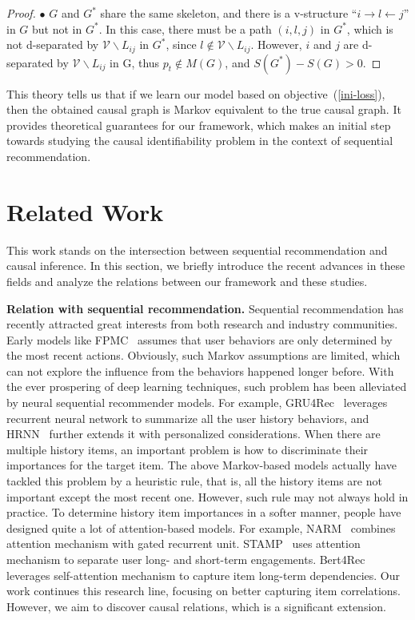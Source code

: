 \documentclass[conference]{IEEEtran}
\theoremstyle{definition}
\theoremstyle{theorem}
\theoremstyle{proof}
\theoremstyle{remark}
\begin{document}
\begin{proof}
	$\bullet$  $G$ and $G^*$ share the same skeleton, and there is a v-structure ``$i\rightarrow l \leftarrow j$'' in $G$ but not in $G^*$.
	In this case, there must be a path $(i,l,j)$ in $G^*$, which is not d-separated by $\mathcal{V}\backslash L_{ij}$ in $G^*$, since $l\not\in \mathcal{V}\backslash L_{ij}$.
	However, $i$ and $j$ are d-separated by $\mathcal{V}\backslash L_{ij}$ in G, thus $p_t\not\in M(G)$, and $S(G^*) - S(G) > 0$.
   
\end{proof} 

This theory tells us that if we learn our model based on objective~(\ref{ini-loss}), then the obtained causal graph is Markov equivalent to the true causal graph.
It provides theoretical guarantees for our framework, which makes an initial step towards studying the causal identifiability problem in the context of sequential recommendation.


\section{Related Work}\label{rela}
This work stands on the intersection between sequential recommendation and causal inference.
In this section, we briefly introduce the recent advances in these fields and analyze the relations between our framework and these studies.

\textbf{Relation with sequential recommendation.}
Sequential recommendation has recently attracted great interests from both research and industry communities.
Early models like FPMC~\cite{rendle2010factorizing} assumes that user behaviors are only determined by the most recent actions.
Obviously, such Markov assumptions are limited, which can not explore the influence from the behaviors happened longer before. 
With the ever prospering of deep learning techniques, such problem has been alleviated by neural sequential recommender models.
For example, GRU4Rec~\cite{hidasi2015session} leverages recurrent neural network to summarize all the user history behaviors, and HRNN~\cite{quadrana2017personalizing} further extends it with personalized considerations.
When there are multiple history items, an important problem is how to discriminate their importances for the target item.
The above Markov-based models actually have tackled this problem by a heuristic rule, that is, all the history items are not important except the most recent one.
However, such rule may not always hold in practice.
To determine history item importances in a {softer} manner, people have designed quite a lot of attention-based models.
For example, NARM~\cite{li2017neural} combines attention mechanism with gated recurrent unit.
STAMP~\cite{liu2018stamp} uses attention mechanism to separate user long- and short-term engagements.
Bert4Rec~\cite{sun2019bert4rec} leverages self-attention mechanism to capture item long-term dependencies.
Our work continues this research line, focusing on better capturing item correlations.
However, we aim to discover causal relations, which is a significant extension.
\end{document}
